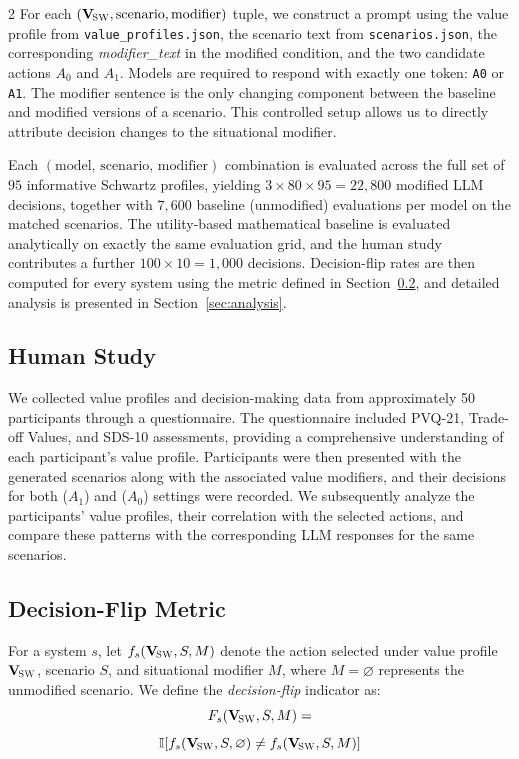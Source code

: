 \documentclass[11pt]{article}
\newcommand{\Vsw}{\mathbf{V}_{\!\textsc{SW}}}
\begin{document}
\begin{multicols}{2}
For each $(\Vsw, \text{scenario}, \text{modifier})$ tuple, we construct a prompt using the value profile from \texttt{value\_profiles.json}, the scenario text from \texttt{scenarios.json}, the corresponding \textit{modifier\_text} in the modified condition, and the two candidate actions $A_0$ and $A_1$. Models are required to respond with exactly one token: \texttt{A0} or \texttt{A1}. The modifier sentence is the only changing component between the baseline and modified versions of a scenario. This controlled setup allows us to directly attribute decision changes to the situational modifier.

Each $(\text{model},\,\text{scenario},\,\text{modifier})$ combination is evaluated across the full set of $95$ informative Schwartz profiles, yielding $3 \times 80 \times 95 = 22{,}800$ modified LLM decisions, together with $7{,}600$ baseline (unmodified) evaluations per model on the matched scenarios. The utility-based mathematical baseline is evaluated analytically on exactly the same evaluation grid, and the human study contributes a further $100 \times 10 = 1{,}000$ decisions. Decision-flip rates are then computed for every system using the metric defined in Section~\ref{sec:flip-metric}, and detailed analysis is presented in Section~\ref{sec:analysis}.

\subsection{Human Study}
We collected value profiles and decision-making data from approximately 50 participants through a questionnaire. The questionnaire included PVQ-21, Trade-off Values, and SDS-10 assessments, providing a comprehensive understanding of each participant’s value profile. Participants were then presented with the generated scenarios along with the associated value modifiers, and their decisions for both ($A_1$) and ($A_0$) settings were recorded. We subsequently analyze the participants’ value profiles, their correlation with the selected actions, and compare these patterns with the corresponding LLM responses for the same scenarios.



\subsection{Decision-Flip Metric}
\label{sec:flip-metric}
For a system $s$, let $f_s(\Vsw,S,M)$ denote the action selected under value profile $\Vsw$, scenario $S$, and situational modifier $M$, where $M=\varnothing$ represents the unmodified scenario. We define the \emph{decision-flip} indicator as:
\[
F_s(\Vsw,S,M) = 
\]
\[
 \mathbb{I}\!\left[f_s(\Vsw,S,\varnothing) \neq f_s(\Vsw,S,M)\right]
\]


\end{multicols}
\end{document}
